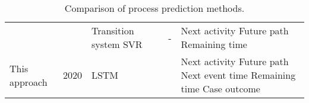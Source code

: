 \begin{table}[]
\begin{tabularx}{\textwidth}{l l p{3.2cm} p{1.1cm} p{1.1cm} p{3cm}}
		 \citeauthor{DBLP:journals/computing/PolatoSBL18} \cite{DBLP:journals/computing/PolatoSBL18}&  \citeyear{DBLP:journals/computing/PolatoSBL18} &  Transition system \newline SVR &  \checkmark & - & Next activity  \newline Future path \newline Remaining time \\
		 
		 This approach &  2020 &  LSTM & \checkmark & \checkmark &  Next activity \newline Future path \newline Next event time  \newline Remaining time \newline Case outcome 
	 	\\ \bottomrule
	\end{tabularx}
	\caption{Comparison  of process prediction methods.}
	\label{tab:preliminaries}
\end{table}